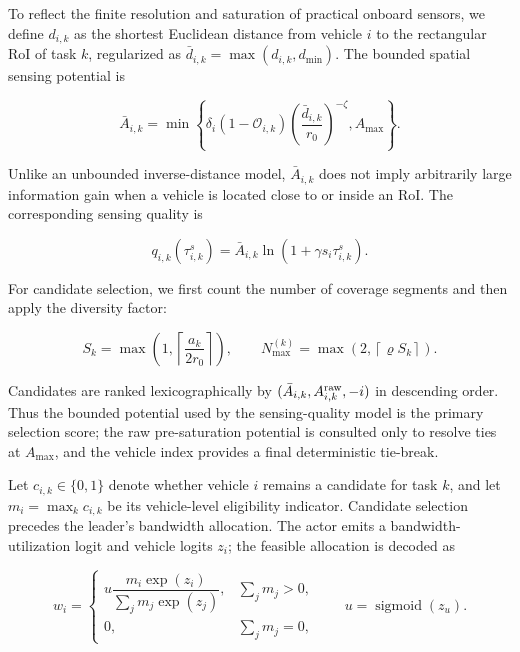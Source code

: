 
To reflect the finite resolution and saturation of practical onboard sensors,
we define $d_{i,k}$ as the shortest Euclidean distance from vehicle $i$ to the
rectangular RoI of task $k$, regularized as
$\bar d_{i,k}=\max(d_{i,k},d_{\min})$. The bounded spatial sensing potential is

\begin{equation}
\bar A_{i,k}=\min\!\left\{
\delta_i(1-\mathcal O_{i,k})
\left(\frac{\bar d_{i,k}}{r_0}\right)^{-\zeta},
A_{\max}
\right\}.
\end{equation}

Unlike an unbounded inverse-distance model, $\bar A_{i,k}$ does not imply
arbitrarily large information gain when a vehicle is located close to or
inside an RoI. The corresponding sensing quality is

\begin{equation}
q_{i,k}(\tau_{i,k}^{s})=\bar A_{i,k}
\ln\!\left(1+\gamma s_i\tau_{i,k}^{s}\right).
\end{equation}

For candidate selection, we first count the number of coverage segments and
then apply the diversity factor:

\begin{equation}
S_k=\max\!\left(1,\left\lceil\frac{a_k}{2r_0}\right\rceil\right),\qquad
N_{\max}^{(k)}=\max\!\left(2,\left\lceil\varrho S_k\right\rceil\right).
\end{equation}

Candidates are ranked lexicographically by
$(\bar A_{i,k},A^{\rm raw}_{i,k},-i)$ in descending order. Thus the bounded
potential used by the sensing-quality model is the primary selection score;
the raw pre-saturation potential is consulted only to resolve ties at
$A_{\max}$, and the vehicle index provides a final deterministic tie-break.

Let $c_{i,k}\in\{0,1\}$ denote whether vehicle $i$ remains a candidate for
task $k$, and let $m_i=\max_k c_{i,k}$ be its vehicle-level eligibility
indicator. Candidate selection precedes the leader's bandwidth allocation.
The actor emits a bandwidth-utilization logit and vehicle logits $z_i$; the
feasible allocation is decoded as

\begin{equation}
w_i=
\begin{cases}
u\dfrac{m_i\exp(z_i)}{\sum_jm_j\exp(z_j)}, & \sum_jm_j>0,\\[4pt]
0, & \sum_jm_j=0,
\end{cases}
\qquad u=\operatorname{sigmoid}(z_u).
\end{equation}


